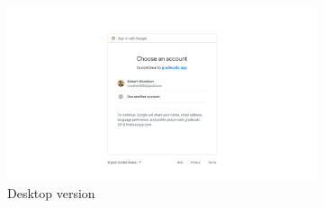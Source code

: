 \vfill
\begin{figure}[ht!]
    \begin{subfigure}[b]{0.757\textwidth-0.1cm}
        \centering
        \includegraphics[frame,width=\textwidth]{media/screenshots/screenshot-login-google-pc.png}
        \caption{Desktop version}
    \end{subfigure}
    \hfill
    \begin{subfigure}[b]{0.243\textwidth-0.1cm}
        \centering

\end{subfigure}
\end{figure}
